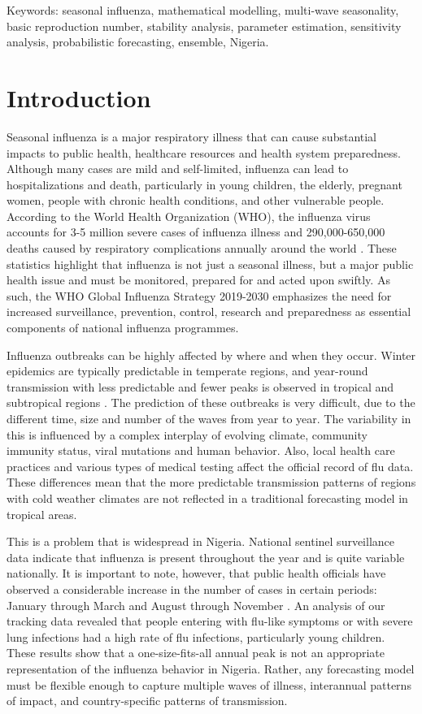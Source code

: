 \documentclass[12pt,a4paper]{article}
\theoremstyle{definition}
\theoremstyle{remark}
\begin{document}
Keywords: seasonal influenza, mathematical modelling, multi-wave seasonality, basic reproduction number, stability analysis, parameter estimation, sensitivity analysis, probabilistic forecasting, ensemble, Nigeria.


\section{Introduction}
\label{introduction}

Seasonal influenza is a major respiratory illness that can cause substantial impacts to public health, healthcare resources and health system preparedness. Although many cases are mild and self-limited, influenza can lead to hospitalizations and death, particularly in young children, the elderly, pregnant women, people with chronic health conditions, and other vulnerable people. According to the World Health Organization (WHO), the influenza virus accounts for 3-5 million severe cases of influenza illness and 290,000-650,000 deaths caused by respiratory complications annually around the world \cite{WHO2025influenza}. These statistics highlight that influenza is not just a seasonal illness, but a major public health issue and must be monitored, prepared for and acted upon swiftly. As such, the WHO Global Influenza Strategy 2019-2030 emphasizes the need for increased surveillance, prevention, control, research and preparedness as essential components of national influenza programmes.

Influenza outbreaks can be highly affected by where and when they occur. Winter epidemics are typically predictable in temperate regions, and year-round transmission with less predictable and fewer peaks is observed in tropical and subtropical regions \cite{Yuan2021tropics}. The prediction of these outbreaks is very difficult, due to the different time, size and number of the waves from year to year. The variability in this is influenced by a complex interplay of evolving climate, community immunity status, viral mutations and human behavior. Also, local health care practices and various types of medical testing affect the official record of flu data. These differences mean that the more predictable transmission patterns of regions with cold weather climates are not reflected in a traditional forecasting model in tropical areas.

This is a problem that is widespread in Nigeria. National sentinel surveillance data indicate that influenza is present throughout the year and is quite variable nationally. It is important to note, however, that public health officials have observed a considerable increase in the number of cases in certain periods: January through March and August through November \cite{Akano2024Nigeria}. An analysis of our tracking data revealed that people entering with flu-like symptoms or with severe lung infections had a high rate of flu infections, particularly young children. These results show that a one-size-fits-all annual peak is not an appropriate representation of the influenza behavior in Nigeria. Rather, any forecasting model must be flexible enough to capture multiple waves of illness, interannual patterns of impact, and country-specific patterns of transmission.
\end{document}
